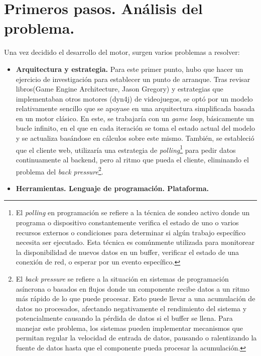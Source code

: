 \section{Primeros pasos. Análisis del problema.}
Una vez decidido el desarrollo del motor, surgen varios problemas a resolver:
\begin{itemize}
    \item \textbf{Arquitectura y estrategia.}
    Para este primer punto, hubo que hacer un ejercicio de investigación para establecer un punto de arranque. Tras revisar libros(Game Engine Architecture, Jason Gregory\cite{GregoryGameEngine}) y estrategias que implementaban otros motores (dyn4j\cite{dyn4j}) de videojuegos, se optó por un modelo relativamente sencillo que se apoyase en una arquitectura simplificada basada en un motor clásico. En este, se trabajaría con un \textit{game loop}, básicamente un bucle infinito, en el que en cada iteración se toma el estado actual del modelo y se actualiza basándose en cálculos sobre este mismo. También, se estableció que el cliente web, utilizaría una estrategia de \textit{polling}\footnote{El \textit{polling} en programación se refiere a la técnica de sondeo activo donde un programa o dispositivo constantemente verifica el estado de uno o varios recursos externos o condiciones para determinar si algún trabajo específico necesita ser ejecutado. Esta técnica es comúnmente utilizada para monitorear la disponibilidad de nuevos datos en un buffer, verificar el estado de una conexión de red, o esperar por un evento específico.} para pedir datos continuamente al backend, pero al ritmo que pueda el cliente, eliminando el problema del \textit{back pressure}\footnote{El \textit{back pressure} se refiere a la situación en sistemas de programación asíncrona o basados en flujos donde un componente recibe datos a un ritmo más rápido de lo que puede procesar. Esto puede llevar a una acumulación de datos no procesados, afectando negativamente el rendimiento del sistema y potencialmente causando la pérdida de datos si el buffer se llena. Para manejar este problema, los sistemas pueden implementar mecanismos que permitan regular la velocidad de entrada de datos, pausando o ralentizando la fuente de datos hasta que el componente pueda procesar la acumulación.}.
    \item \textbf{Herramientas. Lenguaje de programación. Plataforma.}

\end{itemize}
